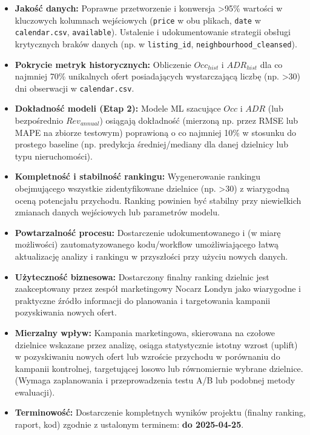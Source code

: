\documentclass[a4paper,11pt]{article}
\begin{document}
\begin{tcolorbox}[enhanced,colback=green!5!white,colframe=green!50!black,
                 boxrule=0.5mm,title=Kryteria sukcesu analityczne/modelowania]
\begin{itemize}[label=\checkmark, leftmargin=*, itemsep=5pt]
  \item \textbf{Jakość danych:} Poprawne przetworzenie i konwersja >95\% wartości w kluczowych kolumnach wejściowych (\texttt{price} w obu plikach, \texttt{date} w \texttt{calendar.csv}, \texttt{available}). Ustalenie i udokumentowanie strategii obsługi krytycznych braków danych (np. w \texttt{listing\_id}, \texttt{neighbourhood\_cleansed}).
  \item \textbf{Pokrycie metryk historycznych:} Obliczenie $Occ_{hist}$ i $ADR_{hist}$ dla co najmniej 70\% unikalnych ofert posiadających wystarczającą liczbę (np. >30) dni obserwacji w \texttt{calendar.csv}.
  \item \textbf{Dokładność modeli (Etap 2):} Modele ML szacujące $Occ$ i $ADR$ (lub bezpośrednio $Rev_{annual}$) osiągają dokładność (mierzoną np. przez RMSE lub MAPE na zbiorze testowym) poprawioną o co najmniej 10\% w stosunku do prostego baseline (np. predykcja średniej/mediany dla danej dzielnicy lub typu nieruchomości).
  \item \textbf{Kompletność i stabilność rankingu:} Wygenerowanie rankingu obejmującego wszystkie zidentyfikowane dzielnice (np. >30) z wiarygodną oceną potencjału przychodu. Ranking powinien być stabilny przy niewielkich zmianach danych wejściowych lub parametrów modelu.
  \item \textbf{Powtarzalność procesu:} Dostarczenie udokumentowanego i (w miarę możliwości) zautomatyzowanego kodu/workflow umożliwiającego łatwą aktualizację analizy i rankingu w przyszłości przy użyciu nowych danych.
\end{itemize}
\end{tcolorbox}

\begin{tcolorbox}[enhanced,colback=cyan!5!white,colframe=cyan!60!black,
                 boxrule=0.5mm,title=Kryteria sukcesu biznesowe]
\begin{itemize}[label=$\bullet$, leftmargin=*, itemsep=5pt]
  \item \textbf{Użyteczność biznesowa:} Dostarczony finalny ranking dzielnic jest zaakceptowany przez zespół marketingowy Nocarz Londyn jako wiarygodne i praktyczne źródło informacji do planowania i targetowania kampanii pozyskiwania nowych ofert.
  \item \textbf{Mierzalny wpływ:} Kampania marketingowa, skierowana na czołowe dzielnice wskazane przez analizę, osiąga statystycznie istotny wzrost (uplift) w pozyskiwaniu nowych ofert lub wzroście przychodu w porównaniu do kampanii kontrolnej, targetującej losowo lub równomiernie wybrane dzielnice. (Wymaga zaplanowania i przeprowadzenia testu A/B lub podobnej metody ewaluacji).
  \item \textbf{Terminowość:} Dostarczenie kompletnych wyników projektu (finalny ranking, raport, kod) zgodnie z ustalonym terminem: \textbf{do 2025-04-25}.
\end{itemize}
\end{tcolorbox}
\end{document}

